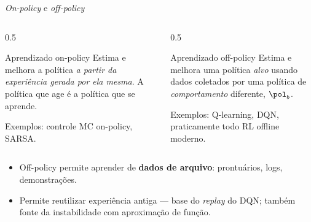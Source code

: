 \documentclass[aspectratio=169, 11pt]{beamer}
\newcommand{\polb}{\pol_b}                 %
\begin{document}
\begin{frame}{\emph{On-policy} e \emph{off-policy}}

  \begin{columns}[T]
    \begin{column}{0.5\textwidth}
      \begin{defbox}{Aprendizado on-policy}
        Estima e melhora a política \emph{a partir da experiência gerada
        por ela mesma}. A política que age é a política que se aprende.
        \smallskip

        {\footnotesize Exemplos: controle MC on-policy, SARSA.}
      \end{defbox}
    \end{column}
    \begin{column}{0.5\textwidth}
      \begin{defbox}{Aprendizado off-policy}
        Estima e melhora uma política \emph{alvo} usando dados coletados
        por uma política de \emph{comportamento} diferente, $\polb$.
        \smallskip

        {\footnotesize Exemplos: Q-learning, DQN, praticamente todo RL
        offline moderno.}
      \end{defbox}
    \end{column}
  \end{columns}

  \medskip
  \begin{itemize}\setlength{\itemsep}{0.3ex}
    \item Off-policy permite aprender de \textbf{dados de arquivo}:
      prontuários, logs, demonstrações.
    \item Permite reutilizar experiência antiga — base do \emph{replay} do
      DQN; também fonte da instabilidade com aproximação de função.
  \end{itemize}
\end{frame}
\end{document}
